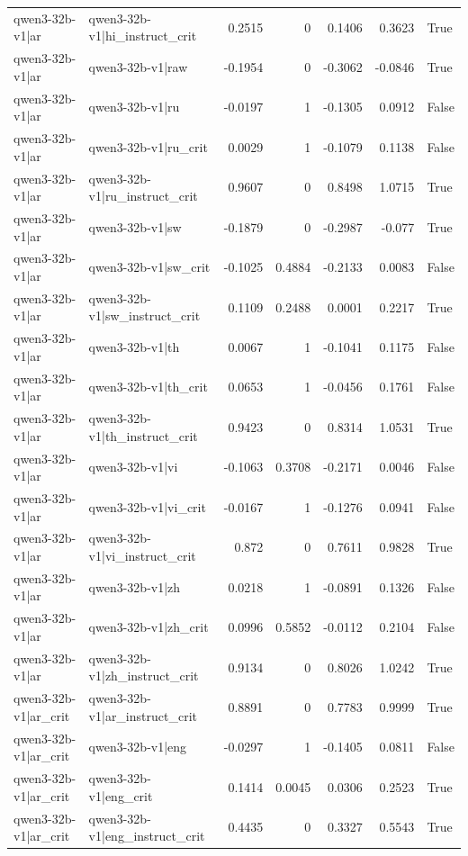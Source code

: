 \begin{table}
\begin{tabular}{l l r r r r l}
qwen3-32b-v1|ar & qwen3-32b-v1|hi_instruct_crit & 0.2515 & 0 & 0.1406 & 0.3623 & True \\
qwen3-32b-v1|ar & qwen3-32b-v1|raw & -0.1954 & 0 & -0.3062 & -0.0846 & True \\
qwen3-32b-v1|ar & qwen3-32b-v1|ru & -0.0197 & 1 & -0.1305 & 0.0912 & False \\
qwen3-32b-v1|ar & qwen3-32b-v1|ru_crit & 0.0029 & 1 & -0.1079 & 0.1138 & False \\
qwen3-32b-v1|ar & qwen3-32b-v1|ru_instruct_crit & 0.9607 & 0 & 0.8498 & 1.0715 & True \\
qwen3-32b-v1|ar & qwen3-32b-v1|sw & -0.1879 & 0 & -0.2987 & -0.077 & True \\
qwen3-32b-v1|ar & qwen3-32b-v1|sw_crit & -0.1025 & 0.4884 & -0.2133 & 0.0083 & False \\
qwen3-32b-v1|ar & qwen3-32b-v1|sw_instruct_crit & 0.1109 & 0.2488 & 0.0001 & 0.2217 & True \\
qwen3-32b-v1|ar & qwen3-32b-v1|th & 0.0067 & 1 & -0.1041 & 0.1175 & False \\
qwen3-32b-v1|ar & qwen3-32b-v1|th_crit & 0.0653 & 1 & -0.0456 & 0.1761 & False \\
qwen3-32b-v1|ar & qwen3-32b-v1|th_instruct_crit & 0.9423 & 0 & 0.8314 & 1.0531 & True \\
qwen3-32b-v1|ar & qwen3-32b-v1|vi & -0.1063 & 0.3708 & -0.2171 & 0.0046 & False \\
qwen3-32b-v1|ar & qwen3-32b-v1|vi_crit & -0.0167 & 1 & -0.1276 & 0.0941 & False \\
qwen3-32b-v1|ar & qwen3-32b-v1|vi_instruct_crit & 0.872 & 0 & 0.7611 & 0.9828 & True \\
qwen3-32b-v1|ar & qwen3-32b-v1|zh & 0.0218 & 1 & -0.0891 & 0.1326 & False \\
qwen3-32b-v1|ar & qwen3-32b-v1|zh_crit & 0.0996 & 0.5852 & -0.0112 & 0.2104 & False \\
qwen3-32b-v1|ar & qwen3-32b-v1|zh_instruct_crit & 0.9134 & 0 & 0.8026 & 1.0242 & True \\
qwen3-32b-v1|ar_crit & qwen3-32b-v1|ar_instruct_crit & 0.8891 & 0 & 0.7783 & 0.9999 & True \\
qwen3-32b-v1|ar_crit & qwen3-32b-v1|eng & -0.0297 & 1 & -0.1405 & 0.0811 & False \\
qwen3-32b-v1|ar_crit & qwen3-32b-v1|eng_crit & 0.1414 & 0.0045 & 0.0306 & 0.2523 & True \\
qwen3-32b-v1|ar_crit & qwen3-32b-v1|eng_instruct_crit & 0.4435 & 0 & 0.3327 & 0.5543 & True \\

\end{tabular}
\end{table}
